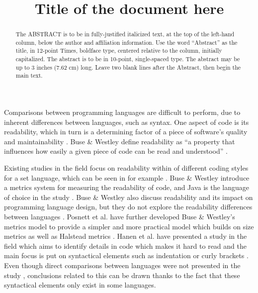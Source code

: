 \documentclass[times, 10pt,twocolumn]{IEEEtran}
\begin{document}
\title{Title of the document here}

\author{


}
\maketitle
\thispagestyle{empty}

\begin{abstract}
   The ABSTRACT is to be in fully-justified italicized text, at the top 
   of the left-hand column, below the author and affiliation 
   information. Use the word ``Abstract'' as the title, in 12-point 
   Times, boldface type, centered relative to the column, initially 
   capitalized. The abstract is to be in 10-point, single-spaced type. 
   The abstract may be up to 3 inches (7.62 cm) long. Leave two blank 
   lines after the Abstract, then begin the main text. 
\end{abstract}



Comparisons between programming languages are difficult to perform, due to inherent differences between languages, such as syntax. One aspect of code is its readability, which in turn is a determining factor of a piece of software's quality and maintainability \cite{aggarwal2002integrated, elshoff1982improving}. Buse \& Westley define readability as ``a property that influences how easily a given piece of code can be read and understood'' \cite{buse2010learning}. 
\newline

Existing studies in the field focus on readability within of different coding styles for a set language, which can be seen in for example \cite{buse2010learning}. Buse \& Westley introduce a metrics system for measuring the readability of code, and Java is the language of choice in the study \cite{buse2010learning}. Buse \& Westley also discuss readability and its impact on programming language design, but they do not explore the readability differences between languages \cite{buse2010learning}. Posnett et al. \cite{posnett2011simpler} have further developed Buse \& Westley's metrics model to provide a simpler and more practical model which builds on size metrics as well as Halstead metrics \cite{halstead1977elements}. Hanen et al. have presented a study in the field which aims to identify details in code which makes it hard to read and the main focus is put on syntactical elements such as indentation or curly brackets \cite{hansen2013makes}. Even though direct comparisons between languages were not presented in the study \cite{hansen2013makes}, conclusions related to this can be drawn thanks to the fact that these syntactical elements only exist in some languages. 
\newline
\end{document}
